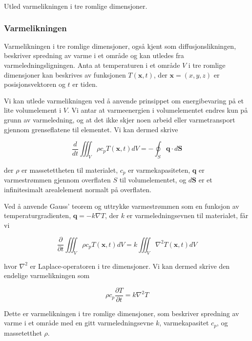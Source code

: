 \homeworkProblem[4]

Utled varmelikningen i tre romlige dimensjoner.

\subsubsection*{Varmelikningen}
Varmelikningen i tre romlige dimensjoner, også kjent som diffusjonslikningen, beskriver spredning av varme i et område og kan utledes fra varmeledningsligningen. Anta at temperaturen i et område $V$ i tre romlige dimensjoner kan beskrives av funksjonen $T(\mathbf{x},t)$, der $\mathbf{x} = (x,y,z)$ er posisjonsvektoren og $t$ er tiden.

Vi kan utlede varmelikningen ved å anvende prinsippet om energibevaring på et lite volumelement i $V$. Vi antar at varmeenergien i volumelementet endres kun på grunn av varmeledning, og at det ikke skjer noen arbeid eller varmetransport gjennom grenseflatene til elementet. Vi kan dermed skrive

\begin{equation*}
    \frac{d}{d t} \iiint_{V} \rho c_{p} T(\mathbf{x}, t) d V=-\oint_{S} \mathbf{q} \cdot d \mathbf{S}
\end{equation*}

der $\rho$ er massetettheten til materialet, $c_p$ er varmekapasiteten, $\mathbf{q}$ er varmestrømmen gjennom overflaten $S$ til volumelementet, og $d\mathbf{S}$ er et infinitesimalt arealelement normalt på overflaten.

Ved å anvende Gauss' teorem og uttrykke varmestrømmen som en funksjon av temperaturgradienten, $\mathbf{q} = -k \nabla T$, der $k$ er varmeledningsevnen til materialet, får vi 

\begin{equation*}
    \frac{\partial}{\partial t} \iiint_{V} \rho c_{p} T(\mathbf{x}, t) d V=k \iiint_{V} \nabla^{2} T(\mathbf{x}, t) d V
\end{equation*}

hvor $\nabla^2$ er Laplace-operatoren i tre dimensjoner. Vi kan dermed skrive den endelige varmelikningen som

\begin{equation*}
\rho c_p \frac{\partial T}{\partial t} = k \nabla^2 T
\end{equation*}

Dette er varmelikningen i tre romlige dimensjoner, som beskriver spredning av varme i et område med en gitt varmeledningsevne $k$, varmekapasitet $c_p$, og massetetthet $\rho$.




